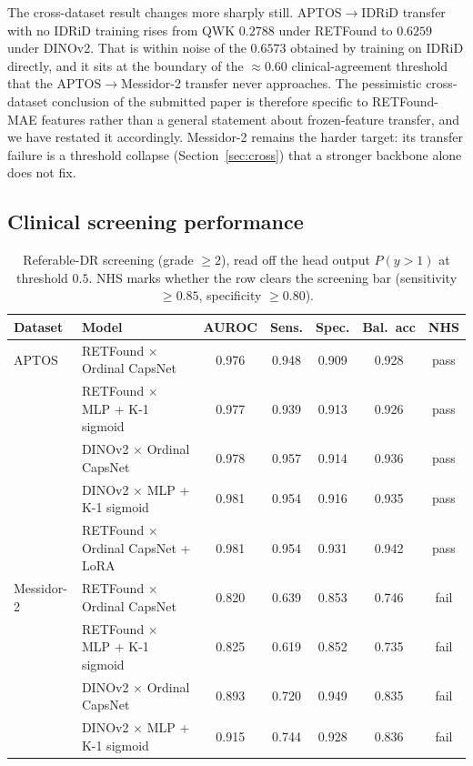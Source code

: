 \documentclass[journal]{IEEEtran}
\begin{document}
The cross-dataset result changes more sharply still. APTOS$\to$IDRiD transfer with no IDRiD training rises from QWK $0.2788$ under RETFound to $0.6259$ under DINOv2. That is within noise of the $0.6573$ obtained by training on IDRiD directly, and it sits at the boundary of the $\approx 0.60$ clinical-agreement threshold that the APTOS$\to$Messidor-2 transfer never approaches. The pessimistic cross-dataset conclusion of the submitted paper is therefore specific to RETFound-MAE features rather than a general statement about frozen-feature transfer, and we have restated it accordingly. Messidor-2 remains the harder target: its transfer failure is a threshold collapse (Section~\ref{sec:cross}) that a stronger backbone alone does not fix.

\subsection{Clinical screening performance}
\label{sec:clinical}
\begin{table}[!t]
\centering
\caption{Referable-DR screening (grade $\geq 2$), read off the head output $P(y{>}1)$ at threshold $0.5$. NHS marks whether the row clears the screening bar (sensitivity $\geq 0.85$, specificity $\geq 0.80$).}
\label{tab:clinical}
\begin{tabular}{llccccc}
\toprule
Dataset & Model & AUROC & Sens. & Spec. & Bal.\ acc & NHS \\
\midrule
APTOS & RETFound $\times$ Ordinal CapsNet & 0.976 & 0.948 & 0.909 & 0.928 & pass \\
 & RETFound $\times$ MLP + K-1 sigmoid & 0.977 & 0.939 & 0.913 & 0.926 & pass \\
 & DINOv2 $\times$ Ordinal CapsNet & 0.978 & 0.957 & 0.914 & 0.936 & pass \\
 & DINOv2 $\times$ MLP + K-1 sigmoid & 0.981 & 0.954 & 0.916 & 0.935 & pass \\
 & RETFound $\times$ Ordinal CapsNet + LoRA & 0.981 & 0.954 & 0.931 & 0.942 & pass \\
\midrule
Messidor-2 & RETFound $\times$ Ordinal CapsNet & 0.820 & 0.639 & 0.853 & 0.746 & fail \\
 & RETFound $\times$ MLP + K-1 sigmoid & 0.825 & 0.619 & 0.852 & 0.735 & fail \\
 & DINOv2 $\times$ Ordinal CapsNet & 0.893 & 0.720 & 0.949 & 0.835 & fail \\
 & DINOv2 $\times$ MLP + K-1 sigmoid & 0.915 & 0.744 & 0.928 & 0.836 & fail \\
\bottomrule
\end{tabular}
\end{table}
\end{document}

